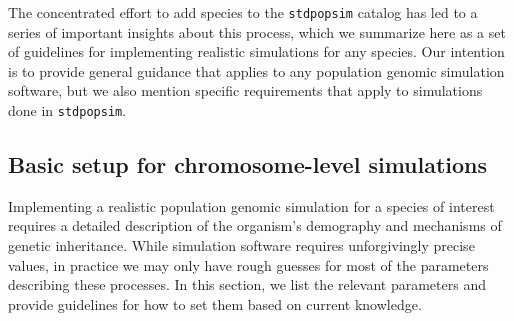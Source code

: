 \documentclass[hidelinks]{article}
\newcommand{\stdpopsim}{\texttt{stdpopsim}\xspace}
\begin{document}
The concentrated effort to add species to the \stdpopsim catalog
has led to a series of important insights about this process,
which we summarize here as a set of guidelines
for implementing realistic simulations for any species.
Our intention is to provide general guidance that applies to any population genomic simulation software,
but we also mention specific requirements that apply to simulations done in \stdpopsim.

\subsection*{Basic setup for chromosome-level simulations}

Implementing a realistic population genomic simulation for a species of interest
requires a detailed description of the organism's demography and mechanisms of genetic inheritance.
While simulation software requires unforgivingly precise values,
in practice we may only have rough guesses for most of the parameters describing these processes.
In this section, we list the relevant parameters and
provide guidelines for how to set them based on current knowledge.
\end{document}
